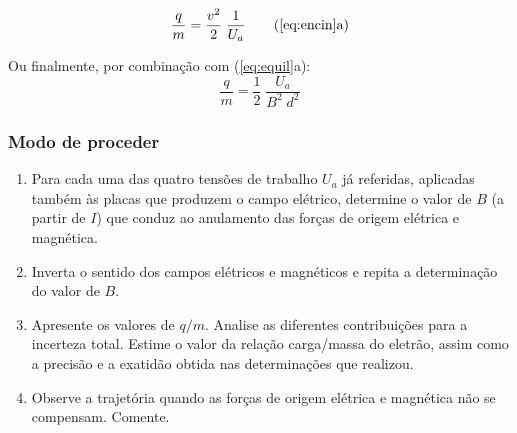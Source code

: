 \documentclass[a4paper,twoside,12pt]{article}      %
\begin{document}
\begin{equation*}
\frac{q}{m} = \frac{v^2}{2} \; \frac{1}{U_a} \qquad \textrm{(\ref{eq:encin}a)}
\end{equation*}

Ou finalmente, por combinação com (\ref{eq:equil}a):
\begin{equation}
\frac{q}{m} = \frac{1}{2} \; \frac{U_a}{B^2\; d^2} 
\end{equation}

\subsubsection{\sf Modo de proceder}
\begin{enumerate}
	\item Para cada uma das quatro tensões de trabalho $U_a$ já referidas, aplicadas também às placas que produzem o campo elétrico, determine o valor de $B$ (a partir de $I$) que conduz ao anulamento das forças de origem elétrica e magnética.
	\item Inverta o sentido dos campos elétricos e magnéticos e repita a determinação do valor de $B$.
	\item Apresente os valores de $q/m$. Analise as diferentes contribuições para a incerteza total. Estime o valor da relação carga/massa do eletrão, assim como a precisão e a exatidão obtida nas determinações que realizou.
	\item  Observe  a  trajetória  quando  as  forças  de 
origem elétrica e magnética não se compensam. Comente. 
\end{enumerate}
\end{document}
